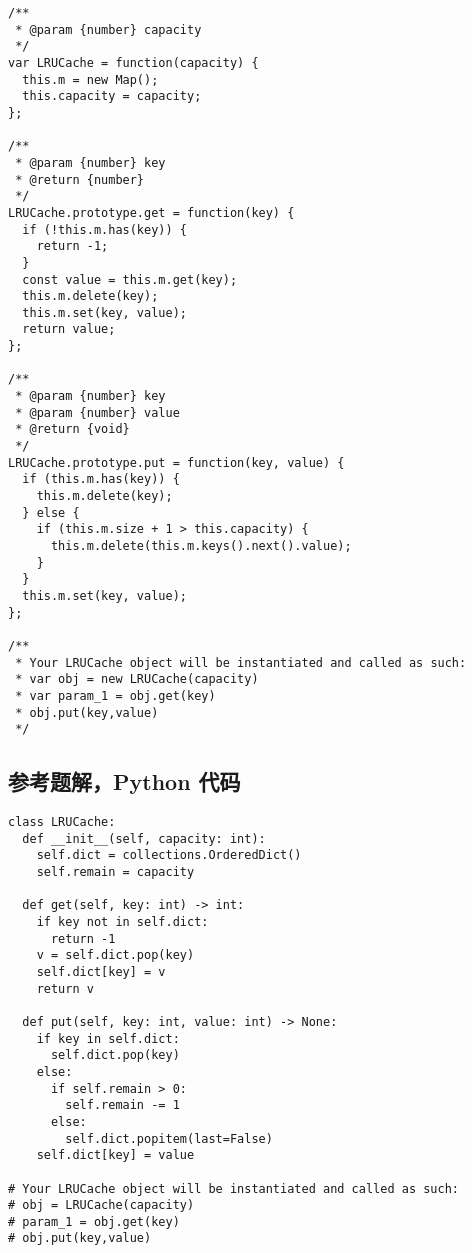 \begin{verbatim}
/**
 * @param {number} capacity
 */
var LRUCache = function(capacity) {
  this.m = new Map();
  this.capacity = capacity;
};

/**
 * @param {number} key
 * @return {number}
 */
LRUCache.prototype.get = function(key) {
  if (!this.m.has(key)) {
    return -1;
  }
  const value = this.m.get(key);
  this.m.delete(key);
  this.m.set(key, value);
  return value;
};

/**
 * @param {number} key
 * @param {number} value
 * @return {void}
 */
LRUCache.prototype.put = function(key, value) {
  if (this.m.has(key)) {
    this.m.delete(key);
  } else {
    if (this.m.size + 1 > this.capacity) {
      this.m.delete(this.m.keys().next().value);
    }
  }
  this.m.set(key, value);
};

/**
 * Your LRUCache object will be instantiated and called as such:
 * var obj = new LRUCache(capacity)
 * var param_1 = obj.get(key)
 * obj.put(key,value)
 */
\end{verbatim}

\subsection{参考题解，Python 代码}

\begin{verbatim}
class LRUCache:
  def __init__(self, capacity: int):
    self.dict = collections.OrderedDict()
    self.remain = capacity

  def get(self, key: int) -> int:
    if key not in self.dict:
      return -1
    v = self.dict.pop(key)
    self.dict[key] = v
    return v

  def put(self, key: int, value: int) -> None:
    if key in self.dict:
      self.dict.pop(key)
    else:
      if self.remain > 0:
        self.remain -= 1
      else:
        self.dict.popitem(last=False)
    self.dict[key] = value

# Your LRUCache object will be instantiated and called as such:
# obj = LRUCache(capacity)
# param_1 = obj.get(key)
# obj.put(key,value)
\end{verbatim}
